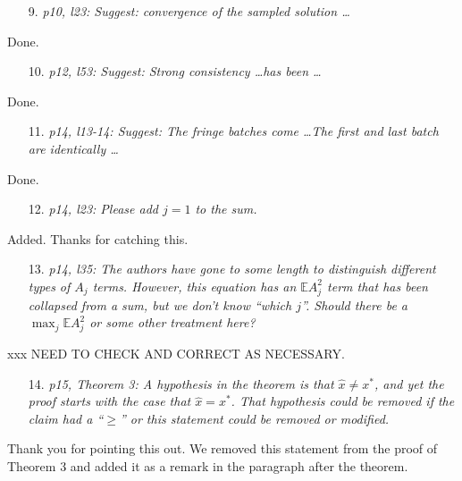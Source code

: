 \documentclass[11pt,notitlepage,onecolumn]{article}
\begin{document}
\begin{itemize}
\item[9.] \textit{p10, l23: Suggest: convergence of the sampled solution \ldots}
\end{itemize}

\noindent 
Done. 
\medskip 


\begin{itemize}
\item[10.] \textit{p12, l53: Suggest: Strong consistency \ldots has been \ldots}
\end{itemize}

\noindent 
Done. 
\medskip 


\begin{itemize}
\item[11.] \textit{p14, l13-14: Suggest: The fringe batches come \ldots The first and last batch are identically \ldots}
\end{itemize}

\noindent 
Done. 
\medskip 


\begin{itemize}
\item[12.] \textit{ p14, l23: Please add $j = 1$ to the sum.}
\end{itemize}

\noindent 
Added. Thanks for catching this.
\medskip 


\begin{itemize}
\item[13.] \textit{p14, l35: The authors have gone to some length to distinguish different types of $A_j$ terms.
However, this equation has an $\mathbb{E}A_j^2$ term that has been collapsed from a sum, but we don't know ``which $j$''. 
Should there be a $\max_j \mathbb{E}A_j^2$ or some other treatment here?}
\end{itemize}

\noindent xxx NEED TO CHECK AND CORRECT AS NECESSARY. 
\medskip 


\begin{itemize}
\item[14.] \textit{p15, Theorem 3: A hypothesis in the theorem is that $\hat{x} \neq x^*$, and yet the proof starts with the case that $\hat{x} = x^*$. 
That hypothesis could be removed if the claim had a ``$\geq$'' or this statement could be removed or modified.}
\end{itemize}

\noindent Thank you for pointing this out.  
We removed this statement from the proof of Theorem 3 and added it as a remark in the paragraph after the theorem.
\medskip 
\end{document}

